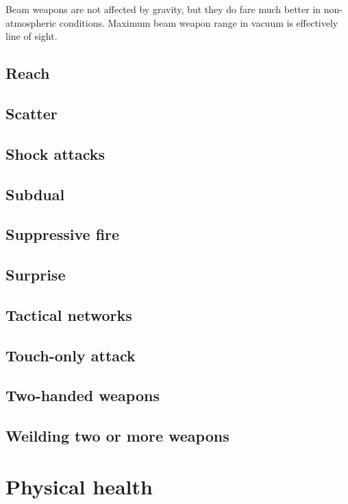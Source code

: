 Beam weapons are not affected by gravity, but they do fare much better in non-atmospheric conditions. Maximum beam weapon range in vacuum is effectively line of sight.

\subsection{Reach}

\subsection{Scatter}

\subsection{Shock attacks}

\subsection{Subdual}

\subsection{Suppressive fire}

\subsection{Surprise}

\subsection{Tactical networks}

\subsection{Touch-only attack}

\subsection{Two-handed weapons}

\subsection{Weilding two or more weapons}

\section{Physical health}
\label{sec:physical-health}

